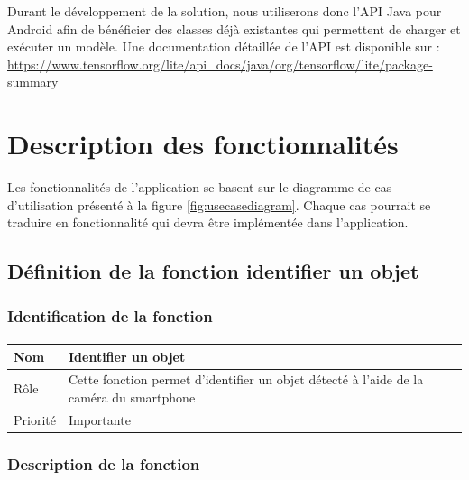 \documentclass[CDS,UTF8,final]{EPURapport}
\begin{document}
Durant le développement de la solution, nous utiliserons donc l'API Java pour Android afin de bénéficier des classes déjà existantes qui permettent de charger et exécuter un modèle. Une documentation détaillée de l'API est disponible sur : \url{https://www.tensorflow.org/lite/api_docs/java/org/tensorflow/lite/package-summary}

\section{Description des fonctionnalités}
Les fonctionnalités de l'application se basent sur le diagramme de cas d'utilisation présenté à la figure \ref{fig:usecasediagram}. Chaque cas pourrait se traduire en fonctionnalité qui devra être implémentée dans l'application.

\subsection{Définition de la fonction identifier un objet}
\subsubsection{Identification de la fonction}
\paragraph{}
\begin{table}[h!]
\centering
\begin{tabular}{|p{4cm}|p{10cm}|}
\hline
Nom      & Identifier un objet                                                                     \\ \hline
Rôle     & Cette fonction permet d'identifier un objet détecté à l'aide de la caméra du smartphone \\ \hline
Priorité & Importante                                                                               \\ \hline
\end{tabular}
\end{table}

\newpage
\subsubsection{Description de la fonction}
\end{document}
